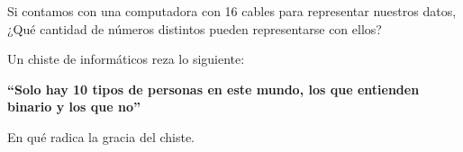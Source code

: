 \begin{exercise}
Si contamos con una computadora con 16 cables para representar nuestros datos,
¿Qué cantidad de números distintos pueden representarse con ellos?
\end{exercise}

\begin{exercise}
Un chiste de informáticos reza lo siguiente:

\textbf{``Solo hay 10 tipos de personas en este mundo, los que entienden binario
y los que no''}

En qué radica la gracia del chiste.
\end{exercise}

    